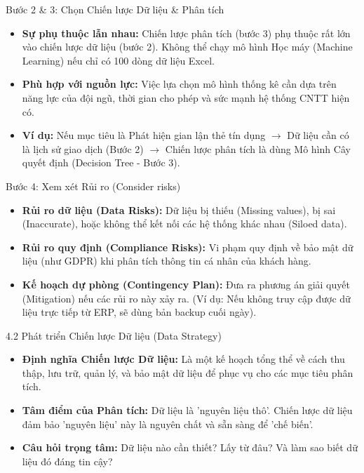 \documentclass[aspectratio=169,12pt]{beamer}
\begin{document}
\begin{frame}{Bước 2 \& 3: Chọn Chiến lược Dữ liệu \& Phân tích}
\begin{itemize}
    \item \textbf{Sự phụ thuộc lẫn nhau:} Chiến lược phân tích (bước 3) phụ thuộc rất lớn vào chiến lược dữ liệu (bước 2). Không thể chạy mô hình Học máy (Machine Learning) nếu chỉ có 100 dòng dữ liệu Excel.
    \item \textbf{Phù hợp với nguồn lực:} Việc lựa chọn mô hình thống kê cần dựa trên năng lực của đội ngũ, thời gian cho phép và sức mạnh hệ thống CNTT hiện có.
    \item \textbf{Ví dụ:} Nếu mục tiêu là Phát hiện gian lận thẻ tín dụng $\rightarrow$ Dữ liệu cần có là lịch sử giao dịch (Bước 2) $\rightarrow$ Chiến lược phân tích là dùng Mô hình Cây quyết định (Decision Tree - Bước 3).
\end{itemize}
\end{frame}

\begin{frame}{Bước 4: Xem xét Rủi ro (Consider risks)}
\begin{itemize}
    \item \textbf{Rủi ro dữ liệu (Data Risks):} Dữ liệu bị thiếu (Missing values), bị sai (Inaccurate), hoặc không thể kết nối các hệ thống khác nhau (Siloed data).
    \item \textbf{Rủi ro quy định (Compliance Risks):} Vi phạm quy định về bảo mật dữ liệu (như GDPR) khi phân tích thông tin cá nhân của khách hàng.
    \item \textbf{Kế hoạch dự phòng (Contingency Plan):} Đưa ra phương án giải quyết (Mitigation) nếu các rủi ro này xảy ra. (Ví dụ: Nếu không truy cập được dữ liệu trực tiếp từ ERP, sẽ dùng bản backup cuối ngày).
\end{itemize}
\end{frame}

\begin{frame}{4.2 Phát triển Chiến lược Dữ liệu (Data Strategy)}
\begin{itemize}
    \item \textbf{Định nghĩa Chiến lược Dữ liệu:} Là một kế hoạch tổng thể về cách thu thập, lưu trữ, quản lý, và bảo mật dữ liệu để phục vụ cho các mục tiêu phân tích.
    \item \textbf{Tâm điểm của Phân tích:} Dữ liệu là 'nguyên liệu thô'. Chiến lược dữ liệu đảm bảo 'nguyên liệu' này là nguyên chất và sẵn sàng để 'chế biến'.
    \item \textbf{Câu hỏi trọng tâm:} Dữ liệu nào cần thiết? Lấy từ đâu? Và làm sao biết dữ liệu đó đáng tin cậy?
\end{itemize}
\end{frame}
\end{document}
